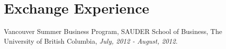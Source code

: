 \documentclass[letterpaper]{article}
\def\footerlink{}
\renewenvironment{itemize}{
  \begin{list}{}{
    \setlength{\leftmargin}{1.5em}
  }
}{
  \end{list}
}
\begin{document}




\section*{Exchange Experience}

\begin{itemize}
  \item Vancouver Summer Business Program, 
   SAUDER School of Business, The University of British Columbia, {\it  July, 2012 - August, 2012}.
\end{itemize}





\end{document}
